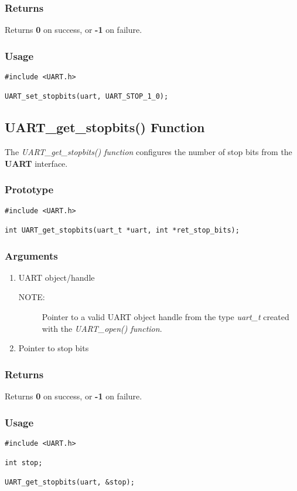 \documentclass{report}
\begin{document}
\subsubsection*{Returns}
Returns \textbf{0} on success, or \textbf{-1} on failure.
\subsubsection*{Usage}
\begin{lstlisting}
#include <UART.h>

UART_set_stopbits(uart, UART_STOP_1_0);
\end{lstlisting}
\subsection{UART\_get\_stopbits() Function}
The \textit{UART\_get\_stopbits() function} configures the number
of stop bits from the \textbf{UART} interface.
\subsubsection*{Prototype}
\begin{lstlisting}
#include <UART.h>

int UART_get_stopbits(uart_t *uart, int *ret_stop_bits);
\end{lstlisting}
\subsubsection*{Arguments}
\begin{enumerate}
\item UART object/handle
\begin{description}
\item[NOTE:] Pointer to a valid UART object handle from the type \textit{uart\_t}
created with the \textit{UART\_open() function}.
\end{description}
\item Pointer to stop bits
\end{enumerate}
\subsubsection*{Returns}
Returns \textbf{0} on success, or \textbf{-1} on failure.
\subsubsection*{Usage}
\begin{lstlisting}
#include <UART.h>

int stop;

UART_get_stopbits(uart, &stop);
\end{lstlisting}
\end{document}
